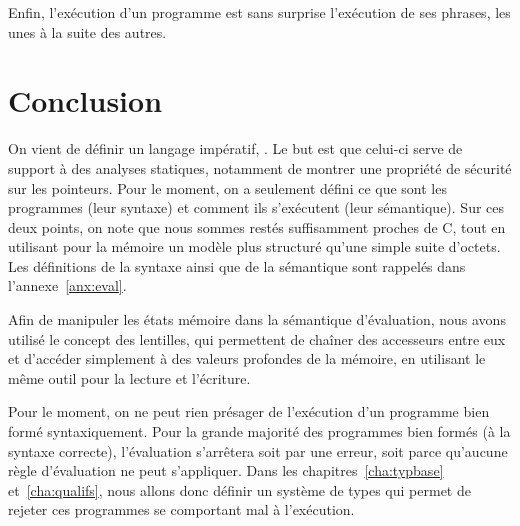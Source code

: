 Enfin, l'exécution d'un programme est sans surprise l'exécution de ses phrases,
les unes à la suite des autres.

\begin{mathpar}




\end{mathpar}

\section*{Conclusion}

On vient de définir un langage impératif, \langname. Le but est que celui-ci
serve de support à des analyses statiques, notamment de montrer une propriété de
sécurité sur les pointeurs. Pour le moment, on a seulement défini ce que sont
les programmes (leur syntaxe) et comment ils s'exécutent (leur sémantique). Sur
ces deux points, on note que nous sommes restés suffisamment proches de C, tout
en utilisant pour la mémoire un modèle plus structuré qu'une simple suite
d'octets.
Les définitions de la syntaxe ainsi que de la sémantique sont rappelés dans
l'annexe~\ref{anx:eval}.

Afin de manipuler les états mémoire dans la sémantique d'évaluation, nous avons
utilisé le concept des lentilles, qui permettent de chaîner des accesseurs entre
eux et d'accéder simplement à des valeurs profondes de la mémoire, en utilisant
le même outil pour la lecture et l'écriture.

Pour le moment, on ne peut rien présager de l'exécution d'un programme bien
formé syntaxiquement. Pour la grande majorité des programmes bien formés (à la
syntaxe correcte), l'évaluation s'arrêtera soit par une erreur, soit parce
qu'aucune règle d'évaluation ne peut s'appliquer. Dans les
chapitres~\ref{cha:typbase} et~\ref{cha:qualifs}, nous allons donc définir un
système de types qui permet de rejeter ces programmes se comportant mal à
l'exécution.

